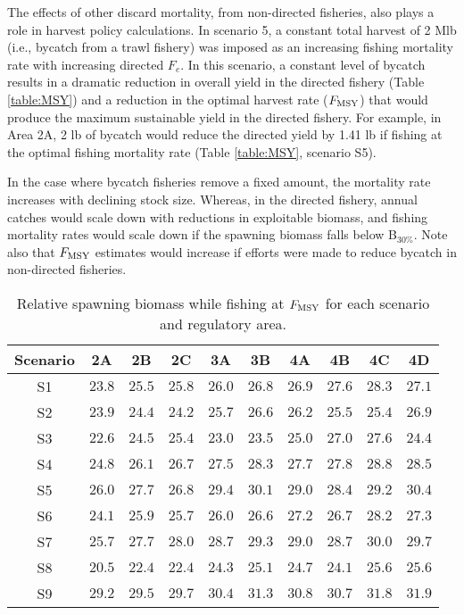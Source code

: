 The effects of other discard mortality, from non-directed fisheries, also plays a role in harvest policy calculations.  In scenario 5, a constant total harvest of 2 Mlb (i.e., bycatch from a trawl fishery) was imposed as an increasing fishing mortality rate with increasing directed $F_e$.  In this scenario, a constant level of bycatch results in a dramatic reduction in overall yield in the directed fishery (Table \ref{table:MSY}) and a reduction in the optimal harvest rate ($F_{\rm{MSY}}$) that would produce the maximum sustainable yield in the directed fishery.  For example, in Area 2A, 2 lb of bycatch would reduce the directed yield by 1.41 lb if fishing at the optimal fishing mortality rate (Table \ref{table:MSY}, scenario S5).  

In the case where bycatch fisheries remove a fixed amount, the mortality rate increases with declining stock size.  Whereas, in the directed fishery, annual catches would scale down with reductions in exploitable biomass, and fishing mortality rates would scale down if the spawning biomass falls below B$_{30\%}$.  Note also that $F_{\rm{MSY}}$ estimates would increase if efforts were made to reduce bycatch in non-directed fisheries.

\begin{table}
	\caption{Relative spawning biomass while fishing at $F_{\rm{MSY}}$ for each scenario and regulatory area.}
	\label{table:Bmsy}
	\begin{center}
		\begin{tabular}{c|ccccccccc}
		\hline
		Scenario & 2A & 2B & 2C & 3A & 3B & 4A & 4B & 4C & 4D\\
		\hline		%
		S1&$23.8$&$25.5$&$25.8$&$26.0$&$26.8$&$26.9$&$27.6$&$28.3$&$27.1$\tabularnewline
		S2&$23.9$&$24.4$&$24.2$&$25.7$&$26.6$&$26.2$&$25.5$&$25.4$&$26.9$\tabularnewline
		S3&$22.6$&$24.5$&$25.4$&$23.0$&$23.5$&$25.0$&$27.0$&$27.6$&$24.4$\tabularnewline
		S4&$24.8$&$26.1$&$26.7$&$27.5$&$28.3$&$27.7$&$27.8$&$28.8$&$28.5$\tabularnewline
		S5&$26.0$&$27.7$&$26.8$&$29.4$&$30.1$&$29.0$&$28.4$&$29.2$&$30.4$\tabularnewline
		S6&$24.1$&$25.9$&$25.7$&$26.0$&$26.6$&$27.2$&$26.7$&$28.2$&$27.3$\tabularnewline
		S7&$25.7$&$27.7$&$28.0$&$28.7$&$29.3$&$29.0$&$28.7$&$30.0$&$29.7$\tabularnewline
		S8&$20.5$&$22.4$&$22.4$&$24.3$&$25.1$&$24.7$&$24.1$&$25.6$&$25.6$\tabularnewline
		S9&$29.2$&$29.5$&$29.7$&$30.4$&$31.3$&$30.8$&$30.7$&$31.8$&$31.9$\tabularnewline
		\hline
		\end{tabular}
	\end{center}
\end{table}

